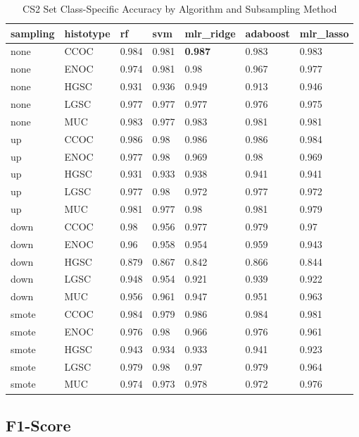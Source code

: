 \documentclass[
]{report}
\begin{document}
\begin{table}

\caption{\label{tab:cs2-accuracy-class-table}CS2 Set Class-Specific Accuracy by Algorithm and Subsampling Method}
\centering
\begin{tabular}[t]{l|l|l|l|l|l|l}
\hline
sampling & histotype & rf & svm & mlr\_ridge & adaboost & mlr\_lasso\\
\hline
none & CCOC & 0.984 & 0.981 & \textbf{0.987} & 0.983 & 0.983\\
\hline
none & ENOC & 0.974 & 0.981 & 0.98 & 0.967 & 0.977\\
\hline
none & HGSC & 0.931 & 0.936 & 0.949 & 0.913 & 0.946\\
\hline
none & LGSC & 0.977 & 0.977 & 0.977 & 0.976 & 0.975\\
\hline
none & MUC & 0.983 & 0.977 & 0.983 & 0.981 & 0.981\\
\hline
up & CCOC & 0.986 & 0.98 & 0.986 & 0.986 & 0.984\\
\hline
up & ENOC & 0.977 & 0.98 & 0.969 & 0.98 & 0.969\\
\hline
up & HGSC & 0.931 & 0.933 & 0.938 & 0.941 & 0.941\\
\hline
up & LGSC & 0.977 & 0.98 & 0.972 & 0.977 & 0.972\\
\hline
up & MUC & 0.981 & 0.977 & 0.98 & 0.981 & 0.979\\
\hline
down & CCOC & 0.98 & 0.956 & 0.977 & 0.979 & 0.97\\
\hline
down & ENOC & 0.96 & 0.958 & 0.954 & 0.959 & 0.943\\
\hline
down & HGSC & 0.879 & 0.867 & 0.842 & 0.866 & 0.844\\
\hline
down & LGSC & 0.948 & 0.954 & 0.921 & 0.939 & 0.922\\
\hline
down & MUC & 0.956 & 0.961 & 0.947 & 0.951 & 0.963\\
\hline
smote & CCOC & 0.984 & 0.979 & 0.986 & 0.984 & 0.981\\
\hline
smote & ENOC & 0.976 & 0.98 & 0.966 & 0.976 & 0.961\\
\hline
smote & HGSC & 0.943 & 0.934 & 0.933 & 0.941 & 0.923\\
\hline
smote & LGSC & 0.979 & 0.98 & 0.97 & 0.979 & 0.964\\
\hline
smote & MUC & 0.974 & 0.973 & 0.978 & 0.972 & 0.976\\
\hline
\end{tabular}
\end{table}

\hypertarget{f1-score-3}{%
\subsection{F1-Score}\label{f1-score-3}}
\end{document}
